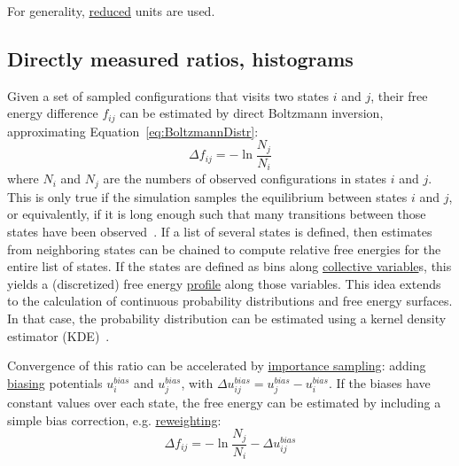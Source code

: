 \documentclass[9pt,review]{livecoms}
\begin{document}
For generality, \hyperlink{ref:reduced} {reduced} units are used.

\subsection{Directly measured ratios, histograms}

Given a set of sampled configurations that visits two states $i$ and $j$, their free energy difference $f_{ij}$ can be estimated by direct Boltzmann inversion, approximating Equation~\eqref{eq:BoltzmannDistr}:
\begin{equation}
\Delta f_{ij} = -\ln \frac{N_j}{N_i}
\label{eq:boltzmann_inversion}
\end{equation}
where $N_i$ and $N_j$ are the numbers of observed configurations in states $i$ and $j$.
This is only true if the simulation samples the equilibrium between states $i$ and $j$, or equivalently, if it is long enough such that many transitions between those states have been observed~\cite{No2009}. If a list of several states is defined, then estimates from neighboring states can be chained to compute relative free energies for the entire list of states.
If the states are defined as bins along \hyperlink{ref:CV} {collective variable}s, this yields a (discretized) free energy \hyperlink{ref:FES} {profile} along those variables.
This idea extends to the calculation of continuous probability distributions and free energy surfaces. In that case, the probability distribution can be estimated using a kernel density estimator (KDE)~\cite{Westerlund2017}.


Convergence of this ratio can be accelerated by \hyperlink{ref:IS} {importance sampling}: adding \hyperlink{ref:biasingE} {biasing} potentials $u^{bias}_i$ and $u^{bias}_j$, with $\Delta u^{bias}_{ij}=u^{bias}_j - u^{bias}_i$.
If the biases have constant values over each state, the free energy can be estimated by including a simple bias correction, e.g. \hyperlink{ref:Reweighting} {reweighting}:
\begin{equation}
\Delta f_{ij} = -\ln \frac{N_j}{N_i} - \Delta u^{bias}_{ij}
\label{eq:boltzmann_inversion_biased}
\end{equation}
\end{document}
